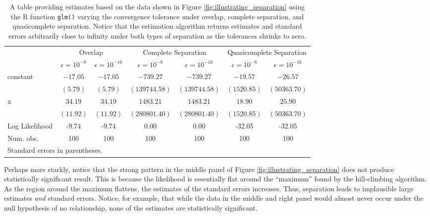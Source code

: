 \documentclass[12pt]{article}
\begin{document}
\begin{table}[H]
\begin{center}
\begin{footnotesize}
\begin{tabular}{l c c | c c | c c }
\hline
 & \multicolumn{2}{c}{Overlap}&\multicolumn{2}{c}{Complete Separation}&\multicolumn{2}{c}{Quasicomplete Separation}\\
               & $\epsilon = 10^{-8}$ & $\epsilon = 10^{-16}$ & $\epsilon = 10^{-8}$ & $\epsilon = 10^{-16}$ & $\epsilon = 10^{-8}$ & $\epsilon = 10^{-16}$ \\
\hline
constant    & $-17.05$ & $-17.05$ & $-739.27$     & $-739.27$     & $-19.57$    & $-26.57$     \\
               & $(5.79)$      & $(5.79)$      & $(139744.58)$ & $(139744.58)$ & $(1520.85)$ & $(50363.70)$ \\
x              & $34.19$  & $34.19$  & $1483.21$     & $1483.21$     & $18.90$     & $25.90$      \\
               & $(11.92)$     & $(11.92)$     & $(280801.40)$ & $(280801.40)$ & $(1520.85)$ & $(50363.70)$ \\
\hline
Log Likelihood & -9.74         & -9.74         & 0.00          & 0.00          & -32.05      & -32.05       \\
Num. obs.      & 100           & 100           & 100           & 100           & 100         & 100          \\
\hline
\multicolumn{7}{l}{Standard errors in parentheses.}
\end{tabular}
\caption{A table providing estimates based on the data shown in Figure \ref{fig:illustrating_separation} using the R function \texttt{glm()} varying the convergence tolerance under overlap, complete separation, and quasicomplete separation. Notice that the estimation algorithm returns estimates and standard errors arbitrarily close to infinity under both types of separation as the tolerances shrinks to zero.}
\label{tab:illustrating_separation}
\end{footnotesize}
\end{center}
\end{table}

Perhaps more starkly, notice  that the strong pattern in the middle panel of Figure \ref{fig:illustrating_separation} does not produce statistically significant result. This is because the likelihood is essentially flat around the ``maximum'' found by the hill-climbing algorithm. As the region around the maximum flattens, the estimates of the standard errors increases. Thus, separation leads to implausible large estimates \textit{and} standard errors. Notice, for example, that while the data in the middle and right panel would almost never occur under the null hypothesis of no relationship, none of the estimates are statistically significant.
\end{document}

